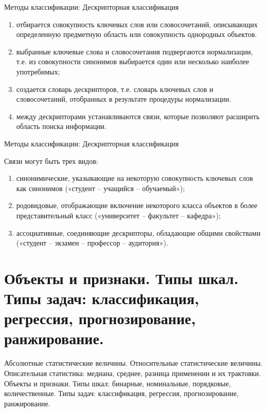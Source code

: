 \documentclass{beamer}
\begin{document}
 \begin{frame}{Методы классификации: Дескрипторная классификация}
 
\begin{enumerate}
\item  отбирается совокупность ключевых слов или словосочетаний, описывающих определенную предметную область или совокупность однородных объектов.
\item  выбранные ключевые слова и словосочетания подвергаются нормализации, т.е. из совокупности синонимов выбирается один или несколько наиболее употребимых;
\item  создается словарь дескрипторов, т.е. словарь ключевых слов и словосочетаний, отобранных в результате процедуры нормализации.
\item  между дескрипторами устанавливаются связи, которые позволяют расширить область поиска информации.

\end{enumerate}

\end{frame}


\begin{frame}{Методы классификации: Дескрипторная классификация}

Связи могут быть трех видов:

\begin{enumerate}

\item  синонимические, указывающие на некоторую совокупность ключевых слов как 
синонимов («студент – учащийся – обучаемый»);
\item  родовидовые, отображающие включение некоторого класса объектов в более 
представительный класс («университет – факультет – кафедра»);
\item  ассоциативные, соединяющие дескрипторы, обладающие общими свойствами 
(«студент – экзамен – профессор – аудитория»).

\end{enumerate}

\end{frame}






\section{Объекты и признаки. Типы шкал. Типы задач: классификация, регрессия, прогнозирование, ранжирование.}


\begin{frame}

Абсолютные статистические величины. Относительные статистические величины. 
Описательная статистика: медиана, среднее, разница применении и их трактовки. Объекты и признаки. 
Типы шкал: бинарные, номинальные, порядковые, количественные. Типы задач: классификация, регрессия, прогнозирование, ранжирование.
\end{frame}
\end{document}
